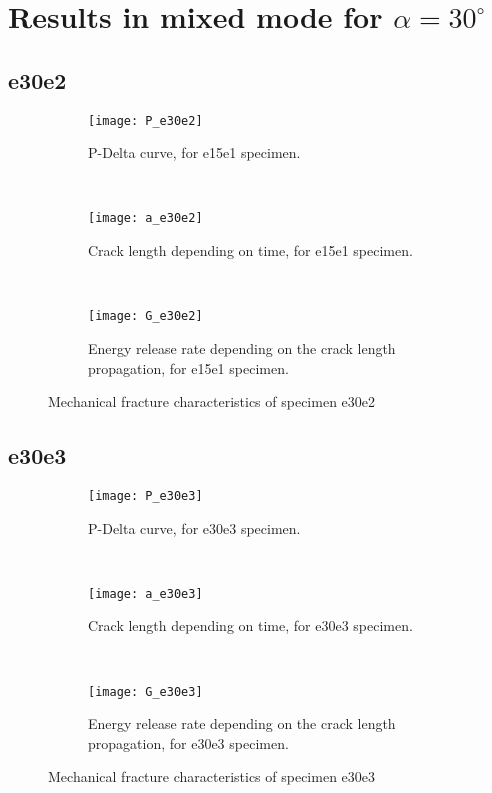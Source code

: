 \section{Results in mixed mode for $\alpha=30 ^\circ$}

\subsection{e30e2}

\begin{figure}[H]
	\centering
	\begin{subfigure}{0.48\linewidth}
		\centering
		\texttt{[image: P\_e30e2]}
		\decoRule
		\caption{P-Delta curve, for e15e1 specimen.}
		\label{fig:P_e30e2}
	\end{subfigure}
	\hfill \\
	\begin{subfigure}{0.48\linewidth}
		\centering
		\texttt{[image: a\_e30e2]}
		\decoRule
		\caption{Crack length depending on time, for e15e1 specimen.}
		\label{fig:a_e30e2}
	\end{subfigure}
	\hfill\\
	\begin{subfigure}{0.48\linewidth}
		\centering
		\texttt{[image: G\_e30e2]}
		\decoRule
		\caption{Energy release rate depending on the crack length propagation, for e15e1 specimen.}
		\label{fig:G_e30e2}
	\end{subfigure}
	\caption{Mechanical fracture characteristics of specimen e30e2}
	\label{E1o_a}
\end{figure}

\subsection{e30e3}

\begin{figure}[H]
	\centering
	\begin{subfigure}{0.48\linewidth}
		\centering
		\texttt{[image: P\_e30e3]}
		\decoRule
		\caption{P-Delta curve, for e30e3 specimen.}
		\label{fig:P_e30e3}
	\end{subfigure}
	\hfill \\
	\begin{subfigure}{0.48\linewidth}
		\centering
		\texttt{[image: a\_e30e3]}
		\decoRule
		\caption{Crack length depending on time, for e30e3 specimen.}
		\label{fig:a_e30e3}
	\end{subfigure}
	\hfill\\
	\begin{subfigure}{0.48\linewidth}
		\centering
		\texttt{[image: G\_e30e3]}
		\decoRule
		\caption{Energy release rate depending on the crack length propagation, for e30e3 specimen.}
		\label{fig:G_e30e3}
	\end{subfigure}
	\caption{Mechanical fracture characteristics of specimen e30e3}
	\label{E1o_a}
\end{figure}

